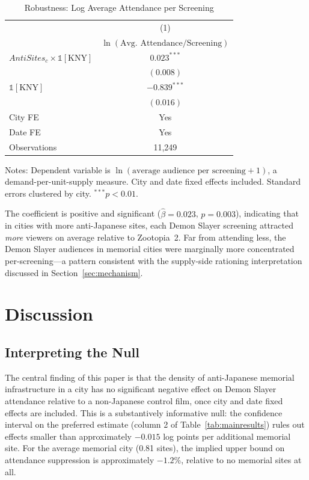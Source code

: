 \documentclass[12pt]{article}
\begin{document}
\begin{table}[H]
\centering
\caption{Robustness: Log Average Attendance per Screening}
\label{tab:robustness}
\begin{threeparttable}
\begin{tabular}{lc}
\toprule
 & (1) \\
 & $\ln(\text{Avg. Attendance/Screening})$ \\
\midrule
$\textit{AntiSites}_c \times \mathbb{1}[\text{KNY}]$ & $0.023^{***}$ \\
 & $(0.008)$ \\
\addlinespace
$\mathbb{1}[\text{KNY}]$ & $-0.839^{***}$ \\
 & $(0.016)$ \\
\addlinespace
City FE & Yes \\
Date FE & Yes \\
\midrule
Observations & 11,249 \\
\bottomrule
\end{tabular}
\begin{tablenotes}
\small
\item Notes: Dependent variable is $\ln(\text{average audience per screening}+1)$, a demand-per-unit-supply measure. City and date fixed effects included. Standard errors clustered by city. $^{***}p<0.01$.
\end{tablenotes}
\end{threeparttable}
\end{table}

The coefficient is positive and significant ($\hat{\beta} = 0.023$, $p = 0.003$), indicating that in cities with more anti-Japanese sites, each Demon Slayer screening attracted \textit{more} viewers on average relative to Zootopia~2. Far from attending less, the Demon Slayer audiences in memorial cities were marginally more concentrated per-screening---a pattern consistent with the supply-side rationing interpretation discussed in Section~\ref{sec:mechanism}.

\section{Discussion}
\label{sec:discussion}

\subsection{Interpreting the Null}

The central finding of this paper is that the density of anti-Japanese memorial infrastructure in a city has no significant negative effect on Demon Slayer attendance relative to a non-Japanese control film, once city and date fixed effects are included. This is a substantively informative null: the confidence interval on the preferred estimate (column 2 of Table~\ref{tab:mainresults}) rules out effects smaller than approximately $-0.015$ log points per additional memorial site. For the average memorial city (0.81 sites), the implied upper bound on attendance suppression is approximately $-1.2$\%, relative to no memorial sites at all.
\end{document}
